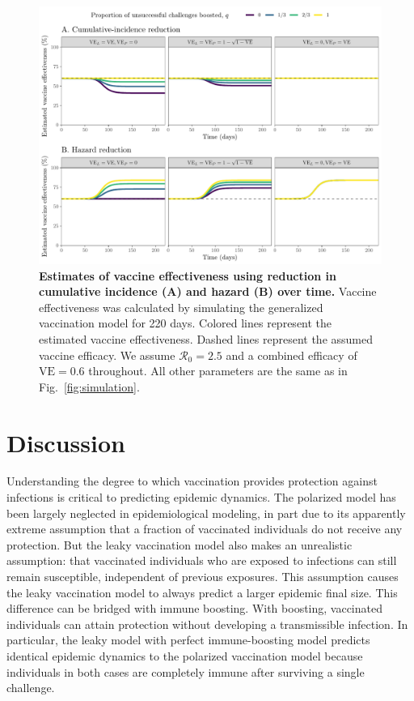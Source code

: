 \documentclass[12pt]{article}
\newcommand{\fref}[1]{Fig.~\ref{fig:#1}}
\newcommand{\Rx}[1]{\ensuremath{{\mathcal R}_{#1}}\xspace}
\newcommand{\Ro}{\Rx{0}}
\newcommand{\VE}{\ensuremath{\mathrm{VE}}}
\begin{document}
\begin{figure}[!th]
\includegraphics[width=\textwidth]{outputs/figure_simulation_efficacy.Rout.tikz.pdf}
\caption{
\textbf{Estimates of vaccine effectiveness using reduction in cumulative incidence (A) and hazard (B) over time.}
Vaccine effectiveness was calculated by simulating the generalized vaccination model for 220 days. 
Colored lines represent the estimated vaccine effectiveness.
Dashed lines represent the assumed vaccine efficacy.
We assume $\Ro = 2.5$ and a combined efficacy of $\VE = 0.6$ throughout. 
All other parameters are the same as in \fref{simulation}.
\label{fig:efficacy}
}
\end{figure}

\section*{Discussion}

Understanding the degree to which vaccination provides protection against infections is critical to predicting epidemic dynamics.
The polarized model has been largely neglected in epidemiological modeling, in part due to its apparently extreme assumption that a fraction of vaccinated individuals do not receive any protection. 
But the leaky vaccination model also makes an unrealistic assumption: that vaccinated individuals who are exposed to infections can still remain susceptible, independent of previous exposures. 
This assumption causes the leaky vaccination model to always predict a larger epidemic final size.
This difference can be bridged with immune boosting. 
With boosting, vaccinated individuals can attain protection without developing a transmissible infection.
In particular, the leaky model with perfect immune-boosting model predicts identical epidemic dynamics to the polarized vaccination model because individuals in both cases are completely immune after surviving a single challenge. 
\end{document}
